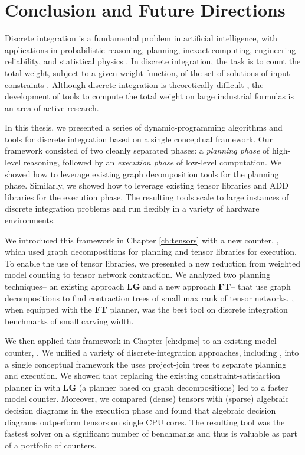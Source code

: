\chapter{Conclusion and Future Directions}
\label{ch:conclusion}
Discrete integration is a fundamental problem in artificial intelligence, with applications in probabilistic reasoning, planning, inexact computing, engineering reliability, and statistical physics \cite{Bacchus2003,DH07,GSS08,naveh2007constraint}. In discrete integration, the task is to count the total weight, subject to a given weight function, of the set of solutions of input constraints \cite{GSS08}. 
Although discrete integration is theoretically difficult \cite{Valiant79}, the development of tools to compute the total weight on large industrial formulas is an area of active research.

In this thesis, we presented a series of dynamic-programming algorithms and tools for discrete integration based on a single conceptual framework.
Our framework consisted of two cleanly separated phases: a \emph{planning phase} of high-level reasoning, followed by an \emph{execution phase} of low-level computation.
We showed how to leverage existing graph decomposition tools for the planning phase.
Similarly, we showed how to leverage existing tensor libraries and ADD libraries for the execution phase.
The resulting tools scale to large instances of discrete integration problems and run flexibly in a variety of hardware environments.

We introduced this framework in Chapter \ref{ch:tensors} with a new counter, , which used graph decompositions for planning and tensor libraries for execution.
To enable the use of tensor libraries, we presented a new reduction from weighted model counting to tensor network contraction. 
We analyzed two planning techniques-- an existing approach \textbf{LG} and a new approach \textbf{FT}-- that use graph decompositions to find contraction trees of small max rank of tensor networks.
, when equipped with the \textbf{FT} planner, was the best tool on discrete integration benchmarks of small carving width.

We then applied this framework in Chapter \ref{ch:dpmc} to an existing model counter,  \cite{DPV20,phan2019weighted}.
We unified a variety of discrete-integration approaches, including , into a single conceptual framework the uses project-join trees to separate planning and execution.
We showed that replacing the existing constraint-satisfaction planner in  with \textbf{LG} (a planner based on graph decompositions) led to a faster model counter. 
Moreover, we compared (dense) tensors with (sparse) algebraic decision diagrams in the execution phase and found that algebraic decision diagrams outperform tensors on single CPU cores.
The resulting tool  was the fastest solver on a significant number of benchmarks and thus is valuable as part of a portfolio of counters.

